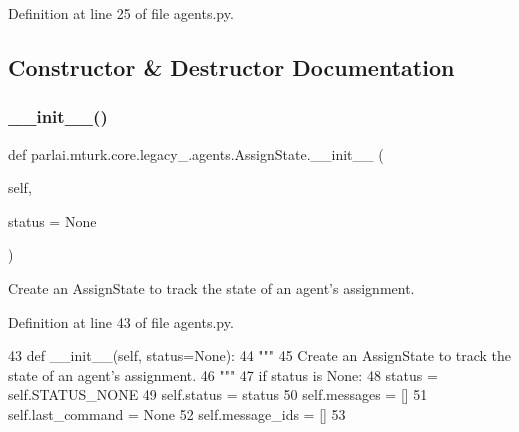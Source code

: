 Definition at line 25 of file agents.\+py.



\subsection{Constructor \& Destructor Documentation}
\mbox{\label{classparlai_1_1mturk_1_1core_1_1legacy__2018_1_1agents_1_1AssignState_a9451ae6465429d1cd27e208fd3f852bf}} 
\subsubsection{\texorpdfstring{\+\_\+\+\_\+init\+\_\+\+\_\+()}{\_\_init\_\_()}}
{\footnotesize\ttfamily def parlai.\+mturk.\+core.\+legacy\+\_.\+agents.\+Assign\+State.\+\_\+\+\_\+init\+\_\+\+\_\+ (\begin{DoxyParamCaption}\item[{}]{self,  }\item[{}]{status = {\ttfamily None} }\end{DoxyParamCaption})}

\begin{DoxyVerb}Create an AssignState to track the state of an agent's assignment.
\end{DoxyVerb}
 

Definition at line 43 of file agents.\+py.


\begin{DoxyCode}
43     \textcolor{keyword}{def }\_\_init\_\_(self, status=None):
44         \textcolor{stringliteral}{"""}
45 \textcolor{stringliteral}{        Create an AssignState to track the state of an agent's assignment.}
46 \textcolor{stringliteral}{        """}
47         \textcolor{keywordflow}{if} status \textcolor{keywordflow}{is} \textcolor{keywordtype}{None}:
48             status = self.STATUS\_NONE
49         self.status = status
50         self.messages = []
51         self.last\_command = \textcolor{keywordtype}{None}
52         self.message\_ids = []
53 
\end{DoxyCode}


